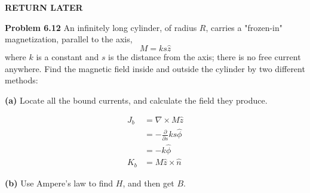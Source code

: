 \documentclass{article}
\begin{document}
\textbf{RETURN LATER}

\textbf{Problem 6.12}
An infinitely long cylinder, of radius $R$, carries a "frozen-in" magnetization, parallel to the axis,
$$M = ks \hat{z}$$
where $k$ is a constant and $s$ is the distance from the axis; there is no free current anywhere.
Find the magnetic field inside and outside the cylinder by two different methods:

\textbf{(a)}
Locate all the bound currents, and calculate the field they produce.

\begin{equation*}
\begin{split}
	J_b & = \nabla \times M \hat{z} \\
	& = - \frac{\partial}{\partial s} k s \hat{\phi} \\
	& = - k \hat{\phi} \\
	K_b & = M \hat{z} \times \hat{n}
\end{split}
\end{equation*}

\textbf{(b)}
Use Ampere's law to find $H$, and then get $B$.
\end{document}

